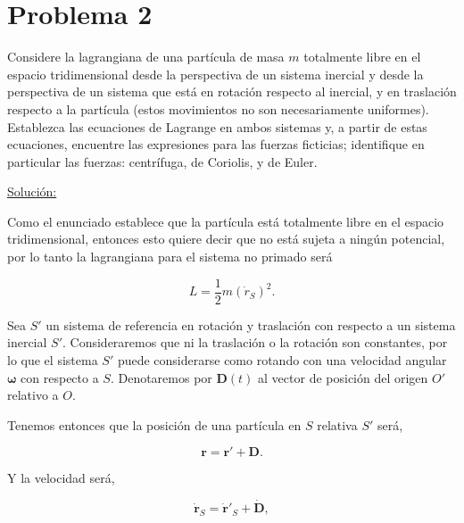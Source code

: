 \documentclass[a4paper,10pt]{article}
\numberwithin{equation}{section}
\begin{document}
\section{Problema 2}

Considere la lagrangiana de una partícula de masa $m$ totalmente libre en el 
espacio tridimensional desde la perspectiva de un sistema inercial y desde la 
perspectiva de un sistema que está en rotación respecto al inercial, y en 
traslación respecto a la partícula (estos movimientos no son necesariamente uniformes). 
Establezca las ecuaciones de Lagrange en ambos sistemas y, a partir de estas ecuaciones, 
encuentre las expresiones para las fuerzas ficticias; identifique en particular 
las fuerzas: centrífuga, de Coriolis, y de Euler.

\vspace{.3cm}

\underline{Solución:} \vspace{.3cm}

Como el enunciado establece que la partícula está totalmente libre en el espacio
tridimensional, entonces esto quiere decir que no está sujeta a ningún potencial, 
por lo tanto la lagrangiana para el sistema no primado será

\begin{equation}
 L = \frac{1}{2}m (\dot{r}_{S})^2.
 \label{eq:lagrangianaEnS}
\end{equation}

Sea $S'$ un sistema de referencia en rotación y traslación con respecto a un sistema inercial 
$S'$. Consideraremos que ni la traslación o la rotación son constantes, por lo que el sistema 
$S'$ puede considerarse como rotando con una velocidad angular $\mathbf{\omega}$ con respecto a
$S$. Denotaremos por $\mathbf{D}(t)$ al vector de posición del origen $O'$ relativo a $O$.

\vspace{.3cm}

Tenemos entonces que la posición de una partícula en $S$ relativa $S'$ será,

\begin{equation}
 \mathbf{r = r' + D}.
\end{equation}

Y la velocidad será,

\begin{equation}
 \mathbf{\dot{r}}_S = \mathbf{\dot{r}}'_S + \mathbf{\dot{D}},
\end{equation}
\end{document}
